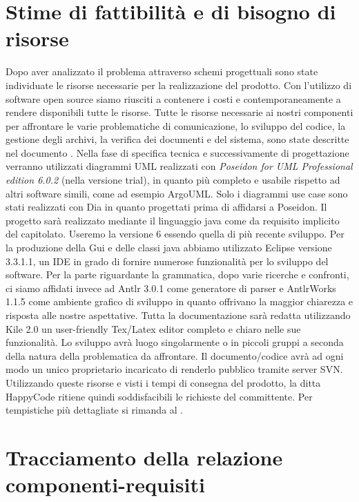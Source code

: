 \documentclass[11pt,titlepage,a4paper]{report}
\begin{document}
\chapter{Stime di fattibilit\`a e di bisogno di risorse}
Dopo aver analizzato il problema attraverso schemi progettuali sono state individuate le risorse necessarie per la realizzazione del prodotto. Con l'utilizzo di software open source siamo riusciti a contenere i costi e contemporaneamente a rendere disponibili tutte le risorse.
Tutte le risorse necessarie ai nostri componenti per affrontare le varie problematiche di comunicazione, lo sviluppo del codice, la gestione degli archivi, la verifica dei documenti e del sistema, sono state descritte nel documento \PdQ.
Nella fase di specifica tecnica e successivamente di progettazione verranno utilizzati diagrammi UML realizzati con \textit{Poseidon for UML Professional edition 6.0.2} (nella versione trial), in quanto pi\`u completo e usabile rispetto ad altri software simili, come ad esempio ArgoUML. Solo i diagrammi use case sono stati realizzati con Dia in quanto progettati prima di affidarsi a Poseidon.
Il progetto sar\`a realizzato mediante il linguaggio java come da requisito implicito del capitolato. Useremo la versione 6 essendo quella di pi\`u recente sviluppo.
Per la produzione della Gui e delle classi java abbiamo utilizzato Eclipse versione 3.3.1.1, un IDE in grado di fornire numerose funzionalit\`a per lo sviluppo del software.
Per la parte riguardante la grammatica, dopo varie ricerche e confronti, ci siamo affidati invece ad Antlr 3.0.1 come generatore di parser e AntlrWorks 1.1.5 come ambiente grafico di sviluppo in quanto offrivano la maggior chiarezza e risposta alle nostre aspettative.
Tutta la documentazione sar\`a redatta utilizzando Kile 2.0 un user-friendly Tex/Latex editor completo e chiaro nelle sue funzionalit\`a.
Lo sviluppo avr\`a luogo singolarmente o in piccoli gruppi a seconda della natura della problematica da affrontare.
Il documento/codice avr\`a ad ogni modo un unico proprietario incaricato di renderlo pubblico tramite server SVN.
Utilizzando queste risorse e visti i tempi di consegna del prodotto, la ditta HappyCode ritiene quindi soddisfacibili le richieste del committente.
Per tempistiche pi\`u dettagliate si rimanda al \PdP.

\chapter{Tracciamento della relazione componenti-requisiti}
\end{document}
